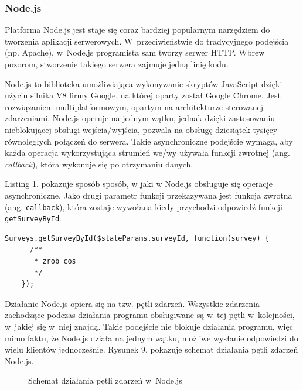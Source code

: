 \documentclass[12pt,a4paper,notitlepage]{article}
\begin{document}
\subsubsection{Node.js}
Platforma  Node.js jest staje się coraz bardziej popularnym narzędziem do tworzenia aplikacji serwerowych. W~przeciwieństwie do tradycyjnego podejścia (np. Apache), w~Node.js programista sam tworzy serwer HTTP. Wbrew pozorom, stworzenie takiego serwera zajmuje jedną linię kodu.
\par Node.js to biblioteka umożliwiająca wykonywanie skryptów JavaScript dzięki użyciu silnika V8 firmy Google, na której oparty został Google Chrome. Jest rozwiązaniem multiplatformowym, opartym na architekturze sterowanej zdarzeniami. Node.js operuje na jednym wątku, jednak dzięki zastosowaniu nieblokującej obsługi wejścia/wyjścia, pozwala na obsługę dziesiątek tysięcy równoległych połączeń do serwera. Takie asynchroniczne podejście wymaga, aby każda operacja wykorzystująca strumień we/wy używała funkcji zwrotnej (ang. \textit{callback}), która wykonuje się po otrzymaniu danych.
\par Listing 1. pokazuje sposób sposób, w jaki w Node.js obsługuje się operacje asynchroniczne. Jako drugi parametr funkcji przekazywana jest funkcja zwrotna (ang. \texttt{callback}), która zostaje wywołana kiedy przychodzi odpowiedź funkcji \texttt{getSurveyById}.
\begin{lstlisting}[caption=Przykład użycia funkcji zwrotnej w~pobraniu danych z~bazy danych. ]
Surveys.getSurveyById($stateParams.surveyId, function(survey) {
      /**
       * zrob cos
       */
    });
\end{lstlisting}
\par Działanie Node.js opiera się na tzw. pętli zdarzeń. Wszystkie zdarzenia zachodzące podczas działania programu obsługiwane są w~tej pętli w~kolejności, w~jakiej się w~niej znajdą. Takie podejście nie blokuje działania programu, więc mimo faktu, że Node.js działa na jednym wątku, możliwe wysłanie odpowiedzi do wielu klientów jednocześnie. Rysunek 9. pokazuje schemat działania pętli zdarzeń Node.js.

\begin{figure}[H]
\begin{center}
\caption{Schemat działania pętli zdarzeń w~Node.js}
\end{center}
\end{figure}
\end{document}
